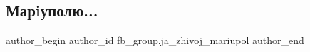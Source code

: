  
 
 
 
 

\subsection{Марiуполю...}
\label{sec:26_02_2023.fb.fb_group.ja_zhivoj_mariupol.1.mariupolyu_}

\ifcmt
 author_begin
   author_id fb_group.ja_zhivoj_mariupol
 author_end
\fi
